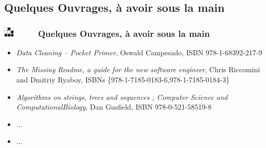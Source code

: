 \documentclass[slidetop,11pt]{beamer}
\def\sectionPartVf{Quelques Ouvrages, {\`a} avoir sous la main}
\def\moreInFrameTitle{\includegraphics[height=0.5cm]{img/logo_glider.png}~~~~~}
\begin{document}
\subsection{\sectionPartVf}
\begin{frame}
	\frametitle{\moreInFrameTitle \sectionPartVf}
	\begin{itemize}
		\item \emph{Data Cleaning -- Pocket Primer}, Oswald Campesado, ISBN 978-1-68392-217-9
		\item \emph{The Missing Readme, a guide for the new software engineer}, Chris Riccomini and Dmitriy Ryaboy, ISBNs \{978-1-7185-0183-6,978-1-7185-0184-3\}
		\item \emph{Algorithms on strings, trees and sequences ; Computer Science and ComputationalBiology}, Dan Gusfield, ISBN 978-0-521-58519-8
		\item ...
		\item ... 
	\end{itemize}
\end{frame}
\end{document}
